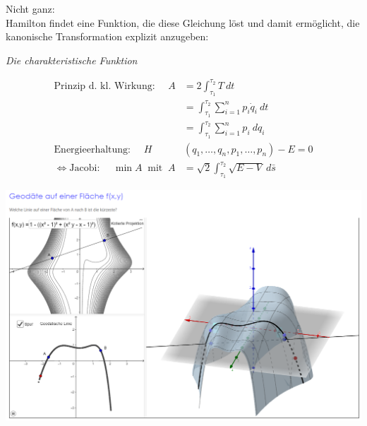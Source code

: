 \begin{frame}
    Nicht ganz: \\
            \vspace{1cm}
    Hamilton findet eine Funktion, die diese Gleichung löst und damit ermöglicht, die kanonische Transformation explizit anzugeben:    
    \begin{center} \emph{Die charakteristische Funktion} \end{center}
\end{frame}

\begin{frame}
    \begin{align*}
        \text{Prinzip d. kl. Wirkung: } \quad A &= 2 \int_{\tau_1}^{\tau_2} T~dt \\
         &=  \int_{\tau_1}^{\tau_2} \sum_{i=1}^{n} p_i \dot{q}_i ~dt \\
         &= \int_{\tau_1}^{\tau_2} \sum_{i=1}^{n} p_i ~ dq_i \\[5mm]
        \text{Energieerhaltung: } \quad  H&(q_1,\ldots,q_n,p_1,\ldots,p_n) - E = 0 \\[5mm]
      \Leftrightarrow  \text{Jacobi: } \quad \min A ~ \text{ mit } ~ A &= \sqrt{2} \int_{\tau_1}^{\tau_2} \sqrt{E-V} ~ d\bar{s}
    \end{align*}
\end{frame}

\begin{frame}
  \vspace*{-0.75cm} \hspace*{-2.3cm} \includegraphics[scale=0.4]{images/geodaete}
\end{frame}


